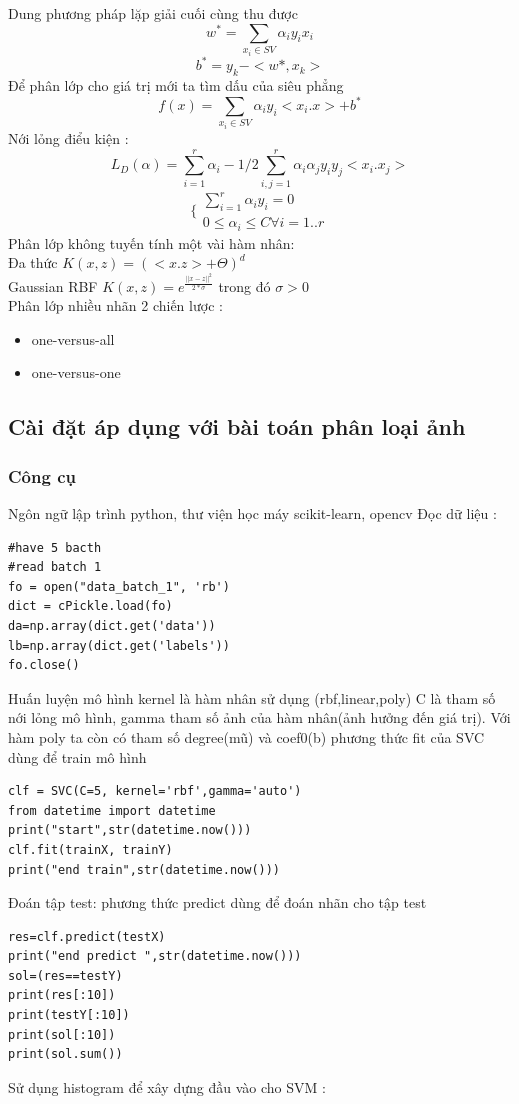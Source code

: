 \documentclass[a4paper,12pt]{report}
\begin{document}
Dung phương pháp lặp giải cuối cùng thu được
$$w^* =\sum_{x_i \in SV} \alpha_i y_i x_i  $$
$$b^*=y_k-<w*,x_k>$$
Để phân lớp cho giá trị mới ta tìm dấu của siêu phẳng $$ f(x)=\sum_{x_i \in SV} \alpha_i y_i <x_i .x>+b^*$$
Nới lỏng điểu kiện :
$$L_D(\alpha)=\sum_{i=1}^r \alpha_i-1/2 \sum_{i,j=1}^{r}\alpha_i \alpha_j y_i y_j<x_i.x_j> $$
$$
\{ \begin{array}{l}
\sum_{i=1 } ^{r} \alpha_i y_i =0 \\
0 \leq \alpha_i \leq C \forall i=1..r
\end{array}
$$
Phân lớp không tuyến tính một vài hàm nhân:\\
Đa thức $K(x,z)=(<x.z>+\Theta)^d $\\
Gaussian RBF $K(x,z)=e^{\frac{||x-z||^2}{2*\sigma}}$ trong đó $\sigma >0$\\
Phân lớp nhiều nhãn 2 chiến lược :
\begin{itemize}
\item one-versus-all
\item one-versus-one 
\end{itemize}
\subsection{Cài đặt áp dụng với bài toán phân loại ảnh}
\subsubsection{Công cụ}
Ngôn ngữ lập trình python, thư viện học máy scikit-learn, opencv
Đọc dữ liệu :
\begin{lstlisting}
#have 5 bacth 
#read batch 1
fo = open("data_batch_1", 'rb')
dict = cPickle.load(fo)
da=np.array(dict.get('data'))
lb=np.array(dict.get('labels'))
fo.close()
\end{lstlisting}
Huấn luyện mô hình kernel là hàm nhân sử dụng (rbf,linear,poly) C là tham số nới lỏng mô hình, gamma tham số ảnh của hàm nhân(ảnh hưởng đến giá trị).
Với hàm poly ta còn có tham số degree(mũ) và coef0(b) phương thức fit của SVC dùng để train mô hình 
\begin{lstlisting}
clf = SVC(C=5, kernel='rbf',gamma='auto')
from datetime import datetime
print("start",str(datetime.now()))
clf.fit(trainX, trainY)
print("end train",str(datetime.now()))
\end{lstlisting}
Đoán tập test: phương thức predict dùng để đoán nhãn cho tập test 
\begin{lstlisting}
res=clf.predict(testX)
print("end predict ",str(datetime.now()))
sol=(res==testY)
print(res[:10])
print(testY[:10])
print(sol[:10])
print(sol.sum())

\end{lstlisting}
Sử dụng histogram để xây dựng đầu vào cho SVM : 
\end{document}
